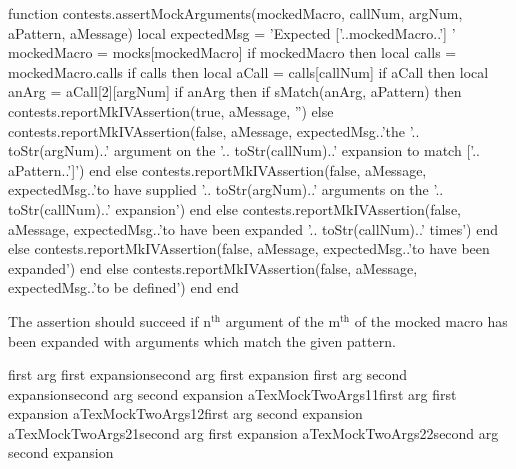 \startLuaCode
function contests.assertMockArguments(mockedMacro,
                                      callNum,
                                      argNum,
                                      aPattern,
                                      aMessage)
  local expectedMsg = 'Expected ['..mockedMacro..'] '
  mockedMacro = mocks[mockedMacro]
  if mockedMacro then
    local calls = mockedMacro.calls
    if calls then
      local aCall = calls[callNum]
      if aCall then
        local anArg = aCall[2][argNum]
        if anArg then
          if sMatch(anArg, aPattern) then
            contests.reportMkIVAssertion(true, aMessage, '')
          else
            contests.reportMkIVAssertion(false, aMessage,
              expectedMsg..'the '..
              toStr(argNum)..' argument on the '..
              toStr(callNum)..' expansion to match ['..
              aPattern..']')
          end
        else
          contests.reportMkIVAssertion(false, aMessage,
            expectedMsg..'to have supplied '..
            toStr(argNum)..' arguments on the '..
            toStr(callNum)..' expansion')
        end
      else
        contests.reportMkIVAssertion(false, aMessage,
          expectedMsg..'to have been expanded '..
          toStr(callNum)..' times')
      end
    else
      contests.reportMkIVAssertion(false, aMessage,
        expectedMsg..'to have been expanded')
    end
  else
    contests.reportMkIVAssertion(false, aMessage,
      expectedMsg..'to be defined')
  end
end
\stopLuaCode


The \type{\assertMockNthArgumentOnMthExpansionMatches} assertion should 
succeed if $\text{n}^{\text{th}}$ argument of the $\text{m}^{\text{th}}$ 
of the mocked macro has been expanded with arguments which match the given 
pattern. 

\startConTest
\startMocking
  \aTexMockTwoArgs%
    {first arg first expansion}{second arg first expansion}
  \aTexMockTwoArgs%
    {first arg second expansion}{second arg second expansion}
  \assertMockNthArgumentOnMthExpansionMatches%
    {aTexMockTwoArgs}{1}{1}{first arg first expansion}{}
  \assertMockNthArgumentOnMthExpansionMatches%
    {aTexMockTwoArgs}{1}{2}{first arg second expansion}{}
  \assertMockNthArgumentOnMthExpansionMatches%
    {aTexMockTwoArgs}{2}{1}{second arg first expansion}{}
  \assertMockNthArgumentOnMthExpansionMatches%
    {aTexMockTwoArgs}{2}{2}{second arg second expansion}{}
\stopMocking
\stopConTest

